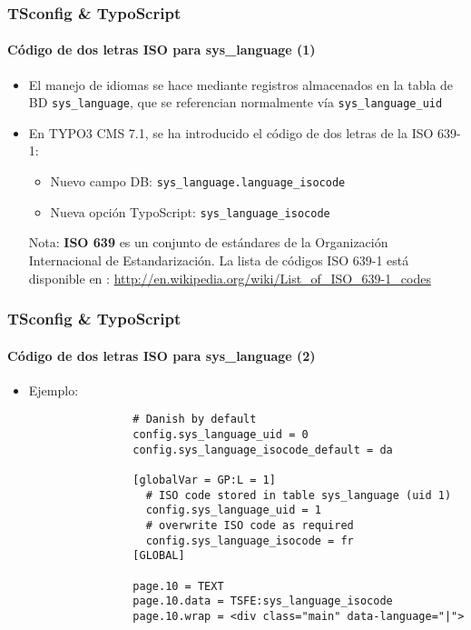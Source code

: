 \begin{frame}[fragile]
	\frametitle{TSconfig \& TypoScript}
	\framesubtitle{Código de dos letras ISO para sys\_language (1)}

	\begin{itemize}
		\item El manejo de idiomas se hace mediante registros almacenados en la tabla de BD
			\texttt{sys\_language}, que se referencian normalmente vía  \texttt{sys\_language\_uid}
		\item En TYPO3 CMS 7.1, se ha introducido el código de dos letras de la ISO 639-1:

			\begin{itemize}
				\item Nuevo campo DB: \texttt{sys\_language.language\_isocode}
				\item Nueva opción TypoScript: \texttt{sys\_language\_isocode}
			\end{itemize}


		\vspace{1cm}

		\small
			Nota: \textbf{ISO 639} es un conjunto de estándares de la Organización Internacional de Estandarización. La lista de códigos ISO 639-1 está disponible en :\newline
			\url{http://en.wikipedia.org/wiki/List_of_ISO_639-1_codes}
		\normalsize

	\end{itemize}

\end{frame}


\begin{frame}[fragile]
	\frametitle{TSconfig \& TypoScript}
	\framesubtitle{Código de dos letras ISO para sys\_language (2)}

	\begin{itemize}
		\item Ejemplo:

			\begin{lstlisting}
				# Danish by default
				config.sys_language_uid = 0
				config.sys_language_isocode_default = da

				[globalVar = GP:L = 1]
				  # ISO code stored in table sys_language (uid 1)
				  config.sys_language_uid = 1
				  # overwrite ISO code as required
				  config.sys_language_isocode = fr
				[GLOBAL]

				page.10 = TEXT
				page.10.data = TSFE:sys_language_isocode
				page.10.wrap = <div class="main" data-language="|">
			\end{lstlisting}

	\end{itemize}

\end{frame}


